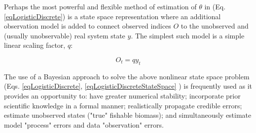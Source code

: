 \documentclass[letterpaper,portrait,11pt]{scrartcl}
\numberwithin{equation}{section}		%
\numberwithin{figure}{section}			%
\numberwithin{table}{section}				%
\begin{document}
Perhaps the most powerful and flexible method of estimation of $\theta$ in (Eq. \ref{eqLogisticDiscrete}) is a state space representation where an additional observation model is added to connect observed indices $O$ to the unobserved and (usually unobservable) real system state $y$. The simplest such model is a simple linear scaling factor, $q$: 

\begin{equation} 
\label{eqLogisticDiscreteStateSpace}
O_t = q y_t
\end{equation}


The use of a Bayesian approach to solve the above nonlinear state space problem (Eqs. \ref{eqLogisticDiscrete}, \ref{eqLogisticDiscreteStateSpace} ) is frequently used as it provides an opportunity to: have greater numerical stability;  incorporate prior scientific knowledge in a formal manner; realistically propagate credible errors; estimate unobserved states ("true" fishable biomass); and simultaneously estimate model "process" errors and data "observation" errors. 
\end{document}
